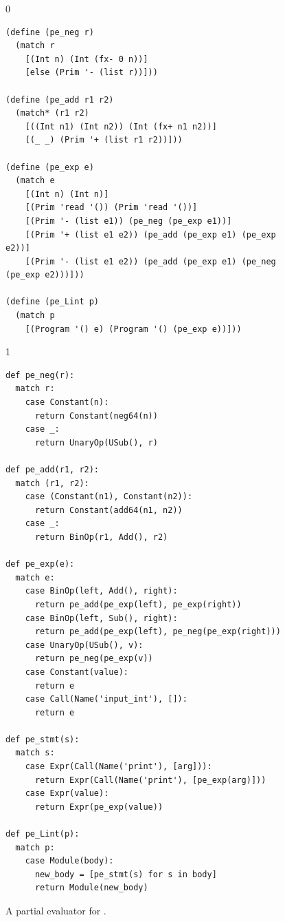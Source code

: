 \documentclass[7x10]{TimesAPriori_MIT}%
\def\racketEd{0}
\def\pythonEd{1}
\providecommand{\BookEdition}{1}
\let\edition\BookEdition
\newcommand{\pythonColor}[0]{}
\numberwithin{theorem}{chapter}
\numberwithin{definition}{chapter}
\numberwithin{equation}{chapter}
\begin{document}
\begin{figure}[tp]
  \begin{tcolorbox}[colback=white]
    {\if\edition\racketEd
\begin{lstlisting}
(define (pe_neg r)
  (match r
    [(Int n) (Int (fx- 0 n))]
    [else (Prim '- (list r))]))

(define (pe_add r1 r2)
  (match* (r1 r2)
    [((Int n1) (Int n2)) (Int (fx+ n1 n2))]
    [(_ _) (Prim '+ (list r1 r2))]))

(define (pe_exp e)
  (match e
    [(Int n) (Int n)]
    [(Prim 'read '()) (Prim 'read '())]
    [(Prim '- (list e1)) (pe_neg (pe_exp e1))]
    [(Prim '+ (list e1 e2)) (pe_add (pe_exp e1) (pe_exp e2))]
    [(Prim '- (list e1 e2)) (pe_add (pe_exp e1) (pe_neg (pe_exp e2)))]))

(define (pe_Lint p)
  (match p
    [(Program '() e) (Program '() (pe_exp e))]))
\end{lstlisting}
\fi}
{\if\edition\pythonEd\pythonColor
\begin{lstlisting}
def pe_neg(r):
  match r:
    case Constant(n):
      return Constant(neg64(n))
    case _:
      return UnaryOp(USub(), r)
  
def pe_add(r1, r2):
  match (r1, r2):
    case (Constant(n1), Constant(n2)):
      return Constant(add64(n1, n2))
    case _:
      return BinOp(r1, Add(), r2)

def pe_exp(e):
  match e:
    case BinOp(left, Add(), right):
      return pe_add(pe_exp(left), pe_exp(right))
    case BinOp(left, Sub(), right):
      return pe_add(pe_exp(left), pe_neg(pe_exp(right)))
    case UnaryOp(USub(), v):
      return pe_neg(pe_exp(v))
    case Constant(value):
      return e
    case Call(Name('input_int'), []):
      return e            

def pe_stmt(s):
  match s:
    case Expr(Call(Name('print'), [arg])):
      return Expr(Call(Name('print'), [pe_exp(arg)]))
    case Expr(value):
      return Expr(pe_exp(value))

def pe_Lint(p):
  match p:
    case Module(body):
      new_body = [pe_stmt(s) for s in body]
      return Module(new_body)
\end{lstlisting}
\fi}
\end{tcolorbox}
\caption{A partial evaluator for \LangInt{}.}
\label{fig:pe-arith}
\end{figure}
\end{document}
